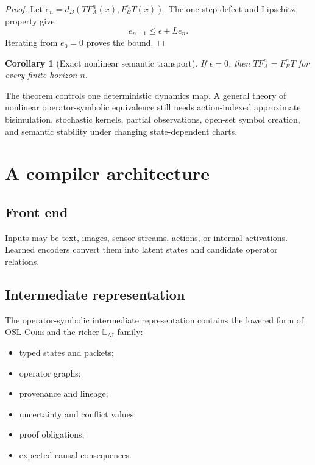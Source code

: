\documentclass[11pt]{article}
\newtheorem{corollary}[theorem]{Corollary}
\theoremstyle{definition}
\theoremstyle{remark}
\newcommand{\LangAI}{\mathbb L_{\mathrm{AI}}}
\newcommand{\OSLCore}{\textnormal{\textsc{OSL-Core}}\xspace}
\begin{document}
\begin{proof}
Let \(e_n=d_B(TF_A^n(x),F_B^nT(x))\). The one-step defect and Lipschitz property give
\[
e_{n+1}\le\epsilon+Le_n.
\]
Iterating from \(e_0=0\) proves the bound.
\end{proof}

\begin{corollary}[Exact nonlinear semantic transport]
If \(\epsilon=0\), then \(TF_A^n=F_B^nT\) for every finite horizon \(n\).
\end{corollary}

\begin{placeholderbox}
The theorem controls one deterministic dynamics map. A general theory of nonlinear operator-symbolic equivalence still needs action-indexed approximate bisimulation, stochastic kernels, partial observations, open-set symbol creation, and semantic stability under changing state-dependent charts.
\end{placeholderbox}

\section{A compiler architecture}

\subsection{Front end}

Inputs may be text, images, sensor streams, actions, or internal activations. Learned encoders convert them into latent states and candidate operator relations.

\subsection{Intermediate representation}

The operator-symbolic intermediate representation contains the lowered form of \OSLCore and the richer \(\LangAI\) family:
\begin{itemize}[leftmargin=1.6em]
  \item typed states and packets;
  \item operator graphs;
  \item provenance and lineage;
  \item uncertainty and conflict values;
  \item proof obligations;
  \item expected causal consequences.
\end{itemize}
\end{document}
